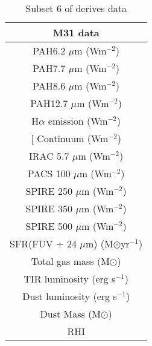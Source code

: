 \begin{table}
\centering
\caption{Subset 6 of derives data}
\label{tab: subset4}
\begin{tabular}{ |c| }
\hline
M31 data  \\
\hline\hline
PAH6.2 $\mu$m (Wm$^{-2}$)  \\
PAH7.7 $\mu$m (Wm$^{-2}$)  \\
PAH8.6 $\mu$m (Wm$^{-2}$)  \\
PAH12.7 $\mu$m (Wm$^{-2}$)  \\
H$\alpha$ emission (Wm$^{-2}$) \\
{[}\sii{]} Continuum (Wm$^{-2}$)  \\
IRAC 5.7 $\mu$m (Wm$^{-2}$)\\
PACS 100 $\mu$m (Wm$^{-2}$)\\
SPIRE 250 $\mu$m (Wm$^{-2}$)\\
SPIRE 350 $\mu$m (Wm$^{-2}$)\\
SPIRE 500 $\mu$m (Wm$^{-2}$)\\
SFR(FUV + 24 $\mu$m) (M$\odot$yr$^{-1}$) \\
Total gas mass (M$\odot$)  \\
TIR luminosity (erg s$^{-1}$)  \\
Dust luminosity (erg s$^{-1}$)  \\
Dust Mass (M$\odot$)\\
RHI \\
\hline
\end{tabular}
\end{table}